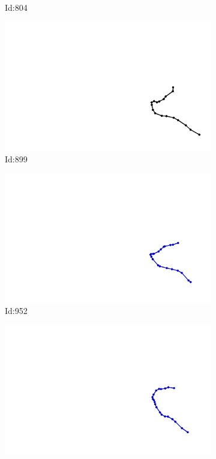 \documentclass[12pt,twoside]{report}
\begin{document}
\begin{figure}
\begin{subfigure}[b]{0.20\textwidth}
\caption{Id:804}
\end{subfigure}
\begin{subfigure}[b]{0.20\textwidth}
\centering
\includegraphics[width=\textwidth]{../trajectories/899.png}
\caption{Id:899}
\end{subfigure}
\begin{subfigure}[b]{0.20\textwidth}
\centering
\includegraphics[width=\textwidth]{../trajectories/952.png}
\caption{Id:952}
\end{subfigure}
\begin{subfigure}[b]{0.20\textwidth}
\centering
\includegraphics[width=\textwidth]{../trajectories/966.png}

\end{subfigure}
\end{figure}
\end{document}

